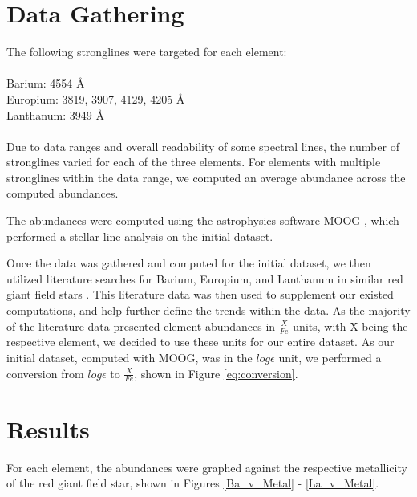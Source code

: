 \section{Data Gathering}
The following stronglines were targeted for each element: \\
\\
Barium: 4554 \AA \\
Europium: 3819, 3907, 4129, 4205 \AA \\
Lanthanum: 3949 \AA \\
\\
Due to data ranges and overall readability of some spectral lines, the number of stronglines varied for each of the three elements. For elements with multiple stronglines within the data range, we computed an average abundance across the computed abundances.

The abundances were computed using the astrophysics software MOOG \cite{moog}, which performed a stellar line analysis on the initial dataset.

Once the data was gathered and computed for the initial dataset, we then utilized literature searches for Barium, Europium, and Lanthanum in similar red giant field stars \cite{burr00,mash00,spin16}. This literature data was then used to supplement our existed computations, and help further define the trends within the data. As the majority of the literature data presented element abundances in $\frac{X}{Fe}$ units, with X being the respective element, we decided to use these units for our entire dataset. As our initial dataset, computed with MOOG, was in the $log\epsilon$ unit, we performed a conversion from $log\epsilon$ to $\frac{X}{Fe}$, shown in Figure \ref{eq:conversion}.

\section{Results}

For each element, the abundances were graphed against the respective metallicity of the red giant field star, shown in Figures \ref{Ba_v_Metal} - \ref{La_v_Metal}.

